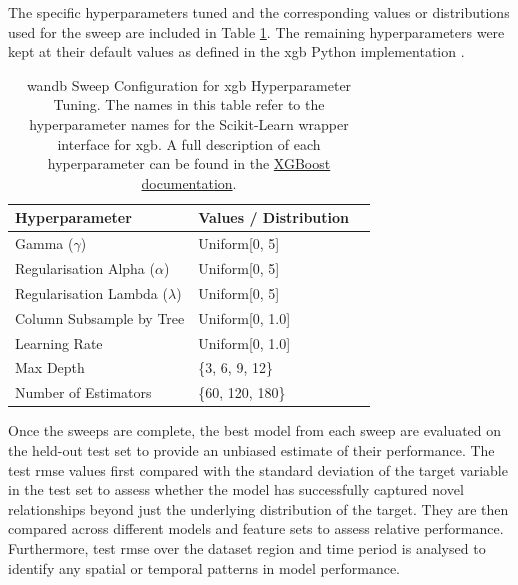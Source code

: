 The specific hyperparameters tuned and the corresponding values or distributions used for the sweep are included in Table \ref{tab:wandb-sweep-config}. The remaining hyperparameters were kept at their default values as defined in the \acrshort{xgb} Python implementation .

\begin{table}[!ht]
    \centering
    \caption{\acrshort{wandb} Sweep Configuration for \acrshort{xgb} Hyperparameter Tuning. The names in this table refer to the hyperparameter names for the Scikit-Learn wrapper interface for \acrshort{xgb}. A full description of each hyperparameter can be found in the \href{https://xgboost.readthedocs.io/en/stable/python/python_api.html\#module-xgboost.sklearn}{XGBoost documentation}.}
    \label{tab:wandb-sweep-config}
    \begin{tabular}{llr}     
        \toprule
        \textbf{Hyperparameter} & \textbf{Values / Distribution} \\ 
        \midrule
        Gamma ($\gamma$) & Uniform[0, 5] \\
        Regularisation Alpha ($\alpha$) & Uniform[0, 5] \\
        Regularisation Lambda ($\lambda$) & Uniform[0, 5] \\
        Column Subsample by Tree & Uniform[0, 1.0] \\
        Learning Rate & Uniform[0, 1.0] \\
        Max Depth & \{3, 6, 9, 12\} \\
        Number of Estimators & \{60, 120, 180\} \\
        \bottomrule
    \end{tabular}
\end{table}

Once the sweeps are complete, the best model from each sweep are evaluated on the held-out test set to provide an unbiased estimate of their performance. The test \acrshort{rmse} values first compared with the standard deviation of the target variable in the test set to assess whether the model has successfully captured novel relationships beyond just the underlying distribution of the target. They are then compared across different models and feature sets to assess relative performance. Furthermore, test \acrshort{rmse} over the dataset region and time period is analysed to identify any spatial or temporal patterns in model performance. 

